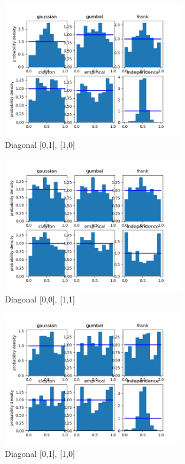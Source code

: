\begin{figure}[h]
	\centering
	\includegraphics[width=0.7\textwidth]{2016-07-18_02_00-2016-07-18_03_00-1.png}
	\caption{Diagonal [0,1], [1,0]}
\end{figure}

\clearpage



\begin{figure}[h]
	\centering
	\includegraphics[width=0.7\textwidth]{2016-10-11_20_00-2016-10-11_21_00-0.png}
	\caption{Diagonal [0,0], [1,1]}
\end{figure}

\begin{figure}[h]
	\centering
	\includegraphics[width=0.7\textwidth]{2016-10-11_20_00-2016-10-11_21_00-1.png}
	\caption{Diagonal [0,1], [1,0]}
\end{figure}

